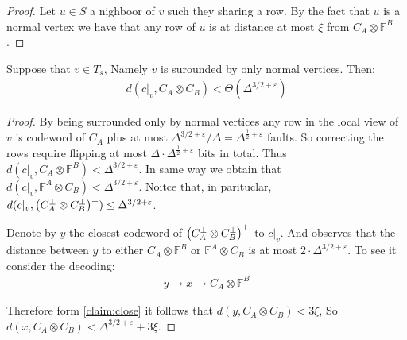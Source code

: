  \begin{proof}
   Let $u \in S$ a nighboor of $v$ such they sharing a row. By the fact that $u$ is a normal vertex we have that any row of $u$ is at distance at most $\xi$ from $C_{A} \otimes \mathbb{F}^{B}$.     
 \end{proof}
\begin{claim}
  \label{claim:closeto}
  Suppose that $v \in T_{s}$, Namely $v$ is surounded by only normal vertices. Then:
  \begin{equation*}
    \begin{split}
      d\left( c|_{v}, C_{A}\otimes C_{B}\right) < \Theta\left( \Delta^{3/2+\varepsilon} \right)
    \end{split}
  \end{equation*} 
 \end{claim}
\begin{proof}
  By being surrounded only by normal vertices any row in the local view of $v$ is codeword of $C_{A}$ plus at most $\Delta^{3/2 + \varepsilon}/\Delta = \Delta^{\frac{1}{2}+\varepsilon}$ faults. So correcting the rows require flipping at most $\Delta \cdot \Delta^{\frac{1}{2} + \varepsilon}$ bits in total.  Thus $d\left(c|_{v}, C_{A}\otimes \mathbb{F}^{B}\right) < \Delta^{3/2 + \varepsilon}$. In same way we obtain that $d\left(c|_{v},  \mathbb{F}^{A} \otimes C_{B}\right) < \Delta^{3/2 + \varepsilon}$. Noitce that, in parituclar, $d(c|_{v}, \left( C_{A}^{\perp}\otimes C_{B}^{\perp} \right)^{\perp}) \le \Delta^{3/2 + \varepsilon}$.

  Denote by $y$ the closest codeword of $\left( C_{A}^{\perp}\otimes C_{B}^{\perp} \right)^{\perp}$ to $c|_{v}$. And observes that the distance between $y$ to either $C_{A} \otimes \mathbb{F}^{B}$ or $\mathbb{F}^{A}\otimes C_{B}$ is at most $2 \cdot \Delta^{3/2 + \varepsilon}$. To see it consider the decoding: 
  \begin{equation*}
    \begin{split}
  y \rightarrow x \rightarrow C_{A} \otimes \mathbb{F}^{B}   
    \end{split}
  \end{equation*}
  
  Therefore form \cref{claim:close} it follows that $d\left(y, C_{A} \otimes C_{B}\right) < 3 \xi $, So $d\left(x, C_{A} \otimes C_{B}\right) < \Delta^{3/2 + \varepsilon} +  3 \xi $.
     \end{proof}
 
 \begin{remark}
   
 \end{remark}

